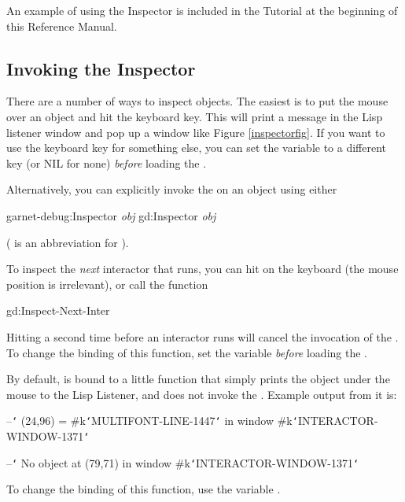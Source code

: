 An example of using the Inspector is included in the Tutorial at the beginning
of this Reference Manual.


\subsection{Invoking the Inspector}
There are a number of ways to inspect objects.  The easiest is to put
the mouse over an object and hit the  keyboard key.  This
will print a message in the Lisp listener window and pop up a window
like Figure \ref{inspectorfig}.  If you want to use the 
keyboard key for something else, you can set the variable
 to a different key (or NIL for none)
{\it before} loading the .

\vspace{1 line}
\begin{group}
Alternatively, you can explicitly invoke the  on an object
using either
\begin{programexample}
garnet-debug:Inspector {\it obj} \value{function}
gd:Inspector {\it obj}
\end{programexample}
( is an abbreviation for ).
\end{group}

To inspect the {\it next} interactor that runs, you can hit
 on the keyboard (the mouse position is irrelevant),
or call the function
\begin{programexample}
gd:Inspect-Next-Inter \value{function}
\end{programexample}
Hitting  a second time before an interactor runs will
cancel the invocation of the .  To change the binding of this
function, set the variable
 {\it before} loading the
.

By default,  is bound to a little function that simply
prints the object under the mouse to the Lisp Listener, and does not
invoke the .  Example output from it is:
\begin{programexample}
--{\tt\char`\>} (24,96) = \#k{\tt\char`\<}MULTIFONT-LINE-1447{\tt\char`\>} in window \#k{\tt\char`\<}INTERACTOR-WINDOW-1371{\tt\char`\>}

--{\tt\char`\>} No object at (79,71) in window \#k{\tt\char`\<}INTERACTOR-WINDOW-1371{\tt\char`\>}
\end{programexample}
To change the binding of this function, use the variable
 .

